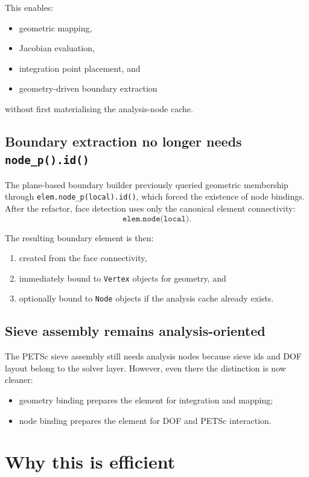 This enables:
\begin{itemize}[nosep]
  \item geometric mapping,
  \item Jacobian evaluation,
  \item integration point placement, and
  \item geometry-driven boundary extraction
\end{itemize}
without first materialising the analysis-node cache.

\subsection{Boundary extraction no longer needs \texttt{node\_p().id()}}

The plane-based boundary builder previously queried geometric membership
through \texttt{elem.node\_p(local).id()}, which forced the existence of node
bindings.  After the refactor, face detection uses only the canonical element
connectivity:
\[
  \texttt{elem.node(local)}.
\]

The resulting boundary element is then:
\begin{enumerate}[nosep]
  \item created from the face connectivity,
  \item immediately bound to \texttt{Vertex} objects for geometry, and
  \item optionally bound to \texttt{Node} objects if the analysis cache already
        exists.
\end{enumerate}

\subsection{Sieve assembly remains analysis-oriented}

The PETSc sieve assembly still needs analysis nodes because sieve ids and DOF
layout belong to the solver layer.  However, even there the distinction is now
cleaner:
\begin{itemize}[nosep]
  \item geometry binding prepares the element for integration and mapping;
  \item node binding prepares the element for DOF and PETSc interaction.
\end{itemize}

\section{Why this is efficient}

